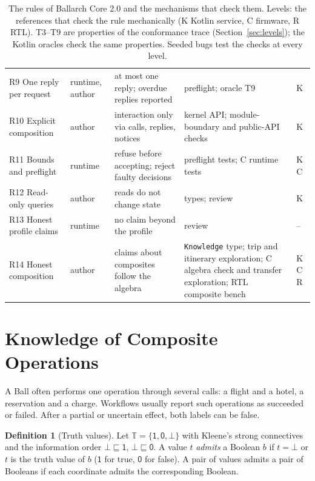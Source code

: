 \documentclass[11pt]{article}
\theoremstyle{definition}
\newtheorem{definition}{Definition}
\theoremstyle{plain}
\newcommand{\yes}{\mathsf{1}}
\newcommand{\no}{\mathsf{0}}
\newcommand{\mayb}{\bot}
\begin{document}
\begin{table}[tp]
\begin{tabularx}{\textwidth}{@{}>{\raggedright\arraybackslash}p{2.6cm}>{\raggedright\arraybackslash}p{1.4cm}>{\raggedright\arraybackslash}X>{\raggedright\arraybackslash}X>{\raggedright\arraybackslash}p{1.1cm}@{}}
R9 One reply per request & runtime, author & at most one reply; overdue replies reported & preflight; oracle T9 & K \\
R10 Explicit composition & author & interaction only via calls, replies, notices & kernel API; module-boundary and public-API checks & K \\
R11 Bounds and preflight & runtime & refuse before accepting; reject faulty decisions & preflight tests; C runtime tests & K C \\
R12 Read-only queries & author & reads do not change state & types; review & K \\
R13 Honest profile claims & runtime & no claim beyond the profile & review & -- \\
R14 Honest composition & author & claims about composites follow the algebra & \texttt{Knowledge} type; trip and itinerary exploration; C algebra check and transfer exploration; RTL composite bench & K C R \\
\bottomrule
\end{tabularx}
\caption{The rules of Ballarch Core 2.0 and the mechanisms that check them. Levels: the references that check the rule mechanically (K Kotlin service, C firmware, R RTL). T3--T9 are properties of the conformance trace (Section~\ref{sec:levels}); the Kotlin oracles check the same properties. Seeded bugs test the checks at every level.}
\label{tab:rules}
\end{table}

\section{Knowledge of Composite Operations}
\label{sec:knowledge}

A Ball often performs one operation through several calls: a flight and a hotel, a reservation and a charge. Workflows usually report such operations as succeeded or failed. After a partial or uncertain effect, both labels can be false.

\begin{definition}[Truth values]
Let $\mathbb{T}=\{\yes,\no,\mayb\}$ with Kleene's strong connectives~\citep{Kleene1952} and the information order $\mayb \sqsubseteq \yes$, $\mayb \sqsubseteq \no$. A value $t$ \emph{admits} a Boolean $b$ if $t=\mayb$ or $t$ is the truth value of $b$ ($\yes$ for true, $\no$ for false). A pair of values admits a pair of Booleans if each coordinate admits the corresponding Boolean.
\end{definition}
\end{document}
